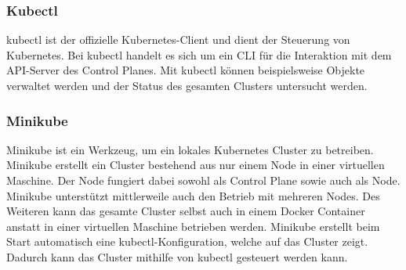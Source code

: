 \subsubsection{Kubectl}

kubectl ist der offizielle Kubernetes-Client und dient der Steuerung von Kubernetes. Bei kubectl handelt es sich um ein \ac{CLI} für die Interaktion mit dem \ac{API}-Server des Control Planes. Mit kubectl können beispielsweise Objekte verwaltet werden und der Status des gesamten Clusters untersucht werden.

\subsubsection{Minikube}

Minikube ist ein Werkzeug, um ein lokales Kubernetes Cluster zu betreiben. Minikube erstellt ein Cluster bestehend aus nur einem Node in einer virtuellen Maschine. Der Node fungiert dabei sowohl als Control Plane sowie auch als Node. Minikube unterstützt mittlerweile auch den Betrieb mit mehreren Nodes. Des Weiteren kann das gesamte Cluster selbst auch in einem Docker Container anstatt in einer virtuellen Maschine betrieben werden. Minikube erstellt beim Start automatisch eine kubectl-Konfiguration, welche auf das Cluster zeigt. Dadurch kann das Cluster mithilfe von kubectl gesteuert werden kann. 